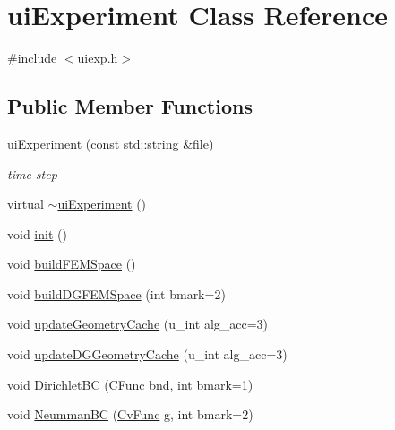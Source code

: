 \hypertarget{classui_experiment}{}\section{ui\+Experiment Class Reference}
\label{classui_experiment}


{\ttfamily \#include $<$uiexp.\+h$>$}

\subsection*{Public Member Functions}
\begin{DoxyCompactItemize}
\item 
\mbox{\hyperlink{classui_experiment_aaebdbaabc4e6ab6d83015dff92519d2c}{ui\+Experiment}} (const std\+::string \&file)
\begin{DoxyCompactList}\small\item\em time step \end{DoxyCompactList}\item 
virtual \mbox{\hyperlink{classui_experiment_a1efc79d41f673a12d42211d099bbc240}{$\sim$ui\+Experiment}} ()
\item 
void \mbox{\hyperlink{classui_experiment_af19926858d11ccf9cb6a732112e381ed}{init}} ()
\item 
void \mbox{\hyperlink{classui_experiment_a82e71dbd631d00315763e0514608f0fb}{build\+F\+E\+M\+Space}} ()
\item 
void \mbox{\hyperlink{classui_experiment_a1ec010eb71e06c6388d67bbe124c951b}{build\+D\+G\+F\+E\+M\+Space}} (int bmark=2)
\item 
void \mbox{\hyperlink{classui_experiment_a406d18d100eaa0c03139590bfa6092af}{update\+Geometry\+Cache}} (u\+\_\+int alg\+\_\+acc=3)
\item 
void \mbox{\hyperlink{classui_experiment_a0c145963361c8f511360e994833a48ef}{update\+D\+G\+Geometry\+Cache}} (u\+\_\+int alg\+\_\+acc=3)
\item 
void \mbox{\hyperlink{classui_experiment_a03675f636c0949ae93bed21719f9a820}{Dirichlet\+BC}} (\mbox{\hyperlink{complex__node___t_h_f_e_m_2emdefs_8h_af8816f473dfdd972d676674921eb65f3}{C\+Func}} \mbox{\hyperlink{complex__node___t_h_f_e_m_2parameter_8h_a0150c722a481cbca4663d2d8b9a9f903}{bnd}}, int bmark=1)
\item 
void \mbox{\hyperlink{classui_experiment_ab4c24c7ae47ac21530ea765bcb970543}{Neumman\+BC}} (\mbox{\hyperlink{complex__edge___t_h_f_e_m_2emdefs_8h_ab4380503f43da11284de79277e96e96b}{Cv\+Func}} g, int bmark=2)

\end{DoxyCompactItemize}
